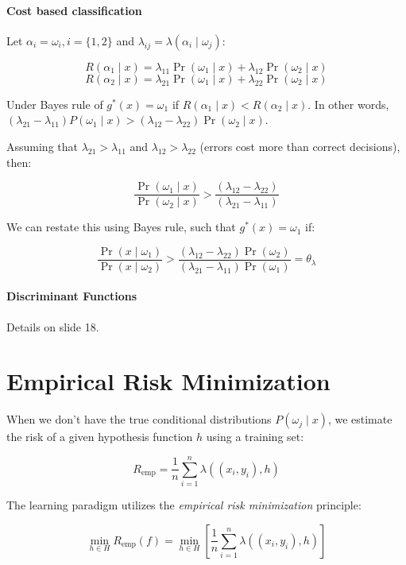 \documentclass{idc_msc}
\begin{document}
\paragraph{Cost based classification}

Let \(\alpha_i = \omega_i, i = \{1,2\}\) and \(\lambda_{ij} = \lambda(\alpha_i \mid \omega_j)\):

\[R(\alpha_1\mid x) = \lambda_{11}\Pr(\omega_1 \mid x) + \lambda_{12} \Pr(\omega_2 \mid x)\]
\[R(\alpha_2\mid x) = \lambda_{21}\Pr(\omega_1 \mid x) + \lambda_{22} \Pr(\omega_2 \mid x)\]

Under Bayes rule of \(g^*(x) = \omega_1\) if \(R(\alpha_1 \mid x) < R(\alpha_2 \mid x)\).
In other words, \((\lambda_{21} - \lambda_{11})P(\omega_1 \mid x) > (\lambda_{12} - \lambda_{22}) \Pr(\omega_2 \mid x)\).

Assuming that \(\lambda_{21} > \lambda_{11}\) and \(\lambda_{12} > \lambda_{22}\) (errors cost more than correct decisions), then:

\[\frac{\Pr(\omega_1 \mid x)}{\Pr(\omega_2 \mid x)} > \frac{(\lambda_{12} - \lambda_{22})}{(\lambda_{21} - \lambda_{11})}\]

We can restate this using Bayes rule, such that \(g^*(x) = \omega_1\) if:

\[\frac{\Pr(x \mid \omega_1)}{\Pr(x \mid \omega_2)} > \frac{(\lambda_{12} - \lambda_{22}) \Pr(\omega_2)}{(\lambda_{21} - \lambda_{11})\Pr(\omega_1)} = \theta_\lambda\]

\paragraph{Discriminant Functions}

Details on slide 18.

\section{Empirical Risk Minimization}

When we don't have the true conditional distributions \(P(\omega_j \mid x)\), we estimate the risk of a given hypothesis function \(h\) using a training set:

\[R_{\text{emp}} = \frac{1}{n}\sum_{i = 1}^n \lambda\left((x_i, y_i), h\right)\]

The learning paradigm utilizes the \emph{empirical risk minimization} principle:

\[\min_{h \in H} R_{\text{emp}}(f) = \min_{h \in H} \left[\frac{1}{n}\sum_{i=1}^n \lambda\left((x_i,y_i), h\right)\right]\]
\end{document}
